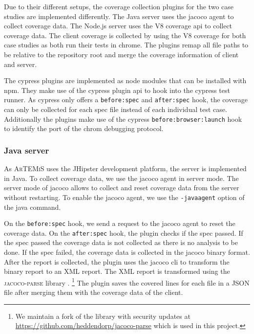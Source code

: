 Due to their different setups, the coverage collection plugins for the two case studies are implemented differently.
The Java server uses the jacoco agent to collect coverage data.
The Node.js server uses the V8 coverage \ac{api} to collect coverage data.
The client coverage is collected by using the V8 coverage for both case studies as both run their tests in chrome.
The plugins remap all file paths to be relative to the repository root and merge the coverage information of client and server.

The cypress plugins are implemented as node modules that can be installed with npm.
They make use of the cypress plugin \ac{api} \autocite{cypressio_writing_nodate} to hook into the cypress test runner.
As cypress only offers a \texttt{before:spec} and \texttt{after:spec} hook, the coverage can only be collected for each spec file instead of each individual test case.
Additionally the plugins make use of the cypress \texttt{before:browser:launch} hook to identify the port of the chrom debugging protocol.
\subsubsection{Java server}
As \textsc{ArTEMiS} uses the JHipster \autocite{jhipster_jhipster_nodate} development platform, the server is implemented in Java.
To collect coverage data, we use the jacoco agent \autocite{noauthor_jacoco_nodate} in server mode.
The server mode of jacoco allows to collect and reset coverage data from the server without restarting.
To enable the jacoco agent, we use the \texttt{-javaagent} option of the java command.

On the \texttt{before:spec} hook, we send a request to the jacoco agent to reset the coverage data.
On the \texttt{after:spec} hook, the plugin checks if the spec passed.
If the spec passed the coverage data is not collected as there is no analysis to be done.
If the spec failed, the coverage data is collected in the jacoco binary format.
After the report is collected, the plugin uses the jacoco \ac{cli} to transform the binary report to an XML report.
The XML report is transformed using the \textsc{jacoco-parse} library \autocite{noauthor_jacoco-parse_2023}.
\footnote{We maintain a fork of the library with security updates at \url{https://github.com/heddendorp/jacoco-parse} which is used in this project.}
The plugin saves the covered lines for each file in a JSON file after merging them with the coverage data of the client.

